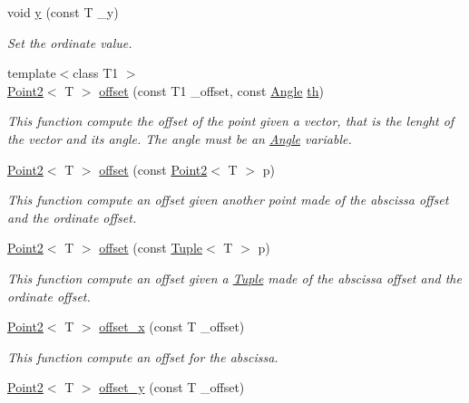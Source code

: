 \begin{DoxyCompactItemize}
void \mbox{\hyperlink{class_point2_a967025762c1b4dede5eb822f5c29522e}{y}} (const T \+\_\+y)
\begin{DoxyCompactList}\small\item\em Set the ordinate value. \end{DoxyCompactList}\item 
{\footnotesize template$<$class T1 $>$ }\\\mbox{\hyperlink{class_point2}{Point2}}$<$ T $>$ \mbox{\hyperlink{class_point2_a1c49ae936487b2f7b72682ba97eed1cb}{offset}} (const T1 \+\_\+offset, const \mbox{\hyperlink{class_angle}{Angle}} \mbox{\hyperlink{class_point2_afe4e1b27eb2a47f6f98695d0b715a044}{th}})
\begin{DoxyCompactList}\small\item\em This function compute the offset of the point given a vector, that is the lenght of the vector and its angle. The angle must be an {\ttfamily \mbox{\hyperlink{class_angle}{Angle}}} variable. \end{DoxyCompactList}\item 
\mbox{\hyperlink{class_point2}{Point2}}$<$ T $>$ \mbox{\hyperlink{class_point2_a45882a15db20f34b2d062d7f11a135cd}{offset}} (const \mbox{\hyperlink{class_point2}{Point2}}$<$ T $>$ p)
\begin{DoxyCompactList}\small\item\em This function compute an offset given another point made of the abscissa offset and the ordinate offset. \end{DoxyCompactList}\item 
\mbox{\hyperlink{class_point2}{Point2}}$<$ T $>$ \mbox{\hyperlink{class_point2_afaa5aa2f9bff328766572129db789059}{offset}} (const \mbox{\hyperlink{class_tuple}{Tuple}}$<$ T $>$ p)
\begin{DoxyCompactList}\small\item\em This function compute an offset given a {\ttfamily \mbox{\hyperlink{class_tuple}{Tuple}}} made of the abscissa offset and the ordinate offset. \end{DoxyCompactList}\item 
\mbox{\hyperlink{class_point2}{Point2}}$<$ T $>$ \mbox{\hyperlink{class_point2_ae1536c8c7960ddfdf2087a9e12ddfcf9}{offset\+\_\+x}} (const T \+\_\+offset)
\begin{DoxyCompactList}\small\item\em This function compute an offset for the abscissa. \end{DoxyCompactList}\item 
\mbox{\hyperlink{class_point2}{Point2}}$<$ T $>$ \mbox{\hyperlink{class_point2_abfbc8c5842e9876f7b89d18575fe138d}{offset\+\_\+y}} (const T \+\_\+offset)

\end{DoxyCompactItemize}
